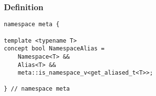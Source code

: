 
\subsubsection{Definition}

\begin{verbatim}
namespace meta {

template <typename T>
concept bool NamespaceAlias =
	Namespace<T> &&
	Alias<T> &&
	meta::is_namespace_v<get_aliased_t<T>>;

} // namespace meta
\end{verbatim}
